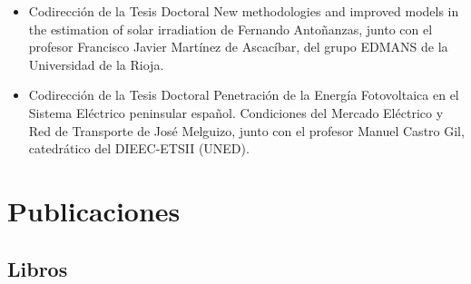 \documentclass[article, a4paper]{memoir}
\begin{document}
\begin{itemize}
\item Codirección de la Tesis Doctoral \guillemotleft{}New methodologies and improved
models in the estimation of solar irradiation\guillemotright{} de Fernando
Antoñanzas, junto con el profesor Francisco Javier Martínez de
Ascacíbar, del grupo EDMANS de la Universidad de la Rioja.

\item Codirección de la Tesis Doctoral \guillemotleft{}Penetración de la Energía
Fotovoltaica en el Sistema Eléctrico peninsular español. Condiciones
del Mercado Eléctrico y Red de Transporte\guillemotright{} de José Melguizo, junto
con el profesor Manuel Castro Gil, catedrático del DIEEC-ETSII
(UNED).
\end{itemize}

\section{Publicaciones}
\label{sec-5}

\subsection{Libros}
\label{sec-5-1}
\end{document}
